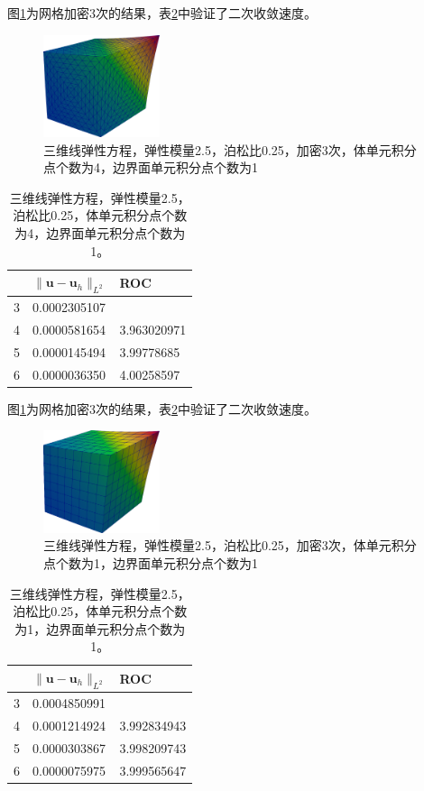 图\ref{fig:4.1.3:1}为网格加密3次的结果，表\ref{tab:4.1.3:1}中验证了二次收敛速度。

\begin{figure}[!htbp]
  \centering
  \includegraphics[height=3cm]{fig/4/4.1.3:1.png}
  \caption{三维线弹性方程，弹性模量2.5，泊松比0.25，加密3次，体单元积分点个数为4，边界面单元积分点个数为1}
  \label{fig:4.1.3:1}
\end{figure}

\begin{table}[!htbp]
  \centering
  \begin{tabular}{c|l|l}
    & $\|\mathbf u-\mathbf u_h\|_{L^2}$ & ROC\\
    \hline
    3 & 0.0002305107    & \\
    \hline
    4 & 0.0000581654   & 3.963020971  \\
    \hline
    5 & 0.0000145494  &  3.99778685 \\
    \hline
    6 & 0.0000036350 &  4.00258597
  \end{tabular}
  \label{tab:4.1.3:1}
  \caption{三维线弹性方程，弹性模量2.5，泊松比0.25，体单元积分点个数为4，边界面单元积分点个数为1。}
\end{table}

\newpage
图\ref{fig:4.1.3:1}为网格加密3次的结果，表\ref{tab:4.1.3:1}中验证了二次收敛速度。

\begin{figure}[!htbp]
  \centering
  \includegraphics[height=3cm]{fig/4/4.1.3:2.png}
  \caption{三维线弹性方程，弹性模量2.5，泊松比0.25，加密3次，体单元积分点个数为1，边界面单元积分点个数为1}
  \label{fig:4.1.3:2}
\end{figure}

\begin{table}[!htbp]
  \centering
  \begin{tabular}{c|l|l}
    & $\|\mathbf u-\mathbf u_h\|_{L^2}$ & ROC\\
    \hline
    3 &  0.0004850991   & \\
    \hline
    4 & 0.0001214924   &  3.992834943 \\
    \hline
    5 & 0.0000303867  &   3.998209743 \\
    \hline
    6 & 0.0000075975 &  3.999565647
  \end{tabular}
  \label{tab:4.1.3:1}
  \caption{三维线弹性方程，弹性模量2.5，泊松比0.25，体单元积分点个数为1，边界面单元积分点个数为1。}
\end{table}


